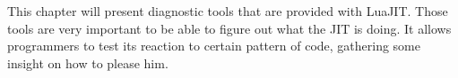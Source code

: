 
This chapter will present diagnostic tools that are provided with LuaJIT.
Those tools are very important to be able to figure out what the JIT is doing.
It allows programmers to test its reaction to certain pattern of code, gathering
some insight on how to please him.
